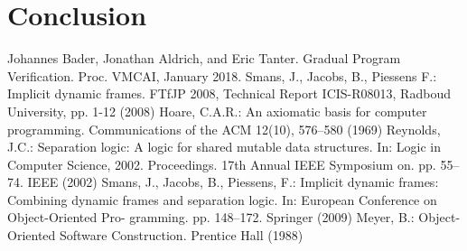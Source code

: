 \documentclass {article}
\begin{document}
\section{Conclusion}
\pagebreak
\begin{thebibliography}{999}

  Johannes Bader, Jonathan Aldrich, and Eric Tanter. Gradual Program Verification. Proc. VMCAI, January 2018.
 Smans, J., Jacobs, B., Piessens F.: Implicit dynamic frames. FTfJP 2008, Technical Report ICIS-R08013, Radboud University, pp. 1-12 (2008)
 Hoare, C.A.R.: An axiomatic basis for computer programming. Communications of the ACM 12(10), 576–580 (1969)
 Reynolds, J.C.: Separation logic: A logic for shared mutable data structures. In: Logic in Computer Science, 2002. Proceedings. 17th Annual IEEE Symposium on.
pp. 55–74. IEEE (2002)
 Smans, J., Jacobs, B., Piessens, F.: Implicit dynamic frames: Combining dynamic frames and separation logic. In: European Conference on Object-Oriented Pro- gramming. pp. 148–172. Springer (2009)
 Meyer, B.: Object-Oriented Software Construction. Prentice Hall (1988)
\end{thebibliography}
\end{document}

